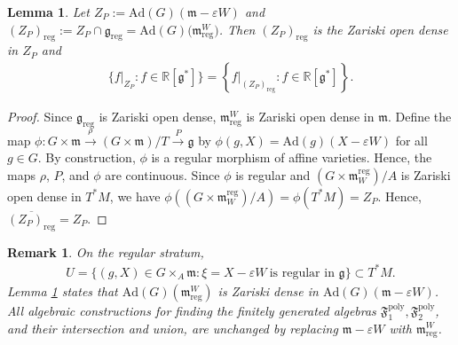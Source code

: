 \documentclass[11pt]{amsart}
\newtheorem{lemma}[theorem]{Lemma}
\theoremstyle{definition}
\theoremstyle{plain}
\newtheorem{remark}[theorem]{Remark}
\theoremstyle{conclusion}
\begin{document}
\begin{lemma} 
\label{lem:regu}
Let $Z_P:=\mathrm{Ad}(G)(\mathfrak{m}-\varepsilon W)$ and $(Z_P)_{\mathrm{reg}}:= Z_P \cap \mathfrak{g}_{\mathrm{reg}} = \mathrm{Ad}(G)\big(\mathfrak{m}_{\mathrm{reg}}^W\big)$. Then $(Z_P)_{\mathrm{reg}}$ is the Zariski open dense in $Z_P$ and \begin{align*}
\bigl\{f\vert_{Z_P}:f\in\mathbb{R}[\mathfrak{g}^*]\bigr\}=\left\{f\vert_{(Z_P)_{\mathrm{reg}}}:f\in\mathbb{R}[\mathfrak{g}^*]\right\}.
\end{align*} 
\end{lemma}
\begin{proof}
    Since $\mathfrak{g}_{\mathrm{reg}}$ is Zariski open dense, $\mathfrak{m}_{\mathrm{reg}}^W$ is Zariski open dense in $\mathfrak{m}$. Define the map $\phi: G \times \mathfrak{m} \xrightarrow{\ \rho\ } (G \times \mathfrak{m})/T \xrightarrow{\ P \ }  \mathfrak{g}$ by $\phi(g,X) = \mathrm{Ad}(g)(X - \varepsilon W)$ for all $g \in G$. By construction, $\phi$ is a regular morphism of affine varieties. Hence, the maps $\rho$, $P$, and $\phi$ are continuous.  Since $\phi$ is regular and $(G \times \mathfrak{m}_W^{\mathrm{reg}})/A$ is Zariski open dense in $T^*M$, we have $ \phi\left((G \times \mathfrak{m}_W^{\mathrm{reg}})/A\right) = \phi(T^*M) = Z_P$. %
    Hence, $\overline{(Z_P)_{\mathrm{reg}}} = Z_P$. 
\end{proof}
\begin{remark}
 On the regular stratum, \begin{align}
    U =\{(g,X)\in G\times_{A}\mathfrak{m}: \xi=X-\varepsilon W\ \text{is regular in }\mathfrak{g}\} \subset T^*M. \label{eq:regularst}
\end{align} Lemma \ref{lem:regu} states that $\mathrm{Ad}(G)(\mathfrak{m}_{\mathrm{reg}}^W)$ is Zariski dense in $\mathrm{Ad}(G)(\mathfrak{m} - \varepsilon W)$. All algebraic constructions for finding the finitely generated algebras $\mathfrak{F}_1^{\mathrm{poly}}, \mathfrak{F}_2^{\mathrm{poly}}$, and their intersection and union, are unchanged by replacing $\mathfrak{m} - \varepsilon W$ with $\mathfrak{m}_{\mathrm{reg}}^W$. %
\end{remark}
\end{document}
